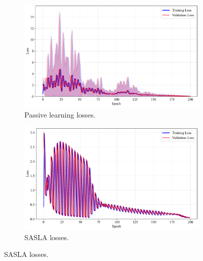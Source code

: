 \documentclass[10pt, conference]{IEEEtran}
\begin{document}
\begin{figure}[!t]
	\centering
	\caption{Losses for training of frameworks with the energy efficiency dataset.}
	
	\begin{subfigure}{\linewidth}
		\centering
		\includegraphics[width=\linewidth]{../results/energy/losses.pdf}
		\caption{Passive learning losses.}
		\label{fig:losses_energy}
	\end{subfigure}
	
	\vspace{0.1em}
	
	\begin{subfigure}{\linewidth}
		\centering
		\includegraphics[width=\linewidth]{../results/energy/os_losses.pdf}
		\caption{SASLA losses.}
		\label{fig:os_losses_energy}
	\end{subfigure}
	
	\vspace{0.1em}
	

\end{figure}
\end{document}
